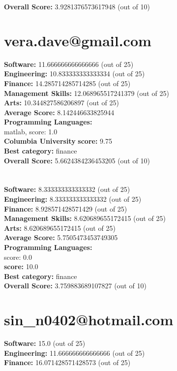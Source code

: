 \documentclass{article}
\begin{document}
\textbf{Overall Score: }3.9281376573617948 (out of 10)\section{vera.dave@gmail.com}
\textbf{Software:} 11.666666666666666 (out of 25)\\
\textbf{Engineering: } 10.833333333333334 (out of 25)\\
\textbf{Finance:} 14.285714285714285 (out of 25)\\
\textbf{Management Skills:} 12.068965517241379 (out of 25)\\
\textbf{Arts:} 10.344827586206897 (out of 25)\\
\textbf{Average Score: } 8.142446633825944\\
\textbf{Programming Languages:} \\
matlab, score: 1.0\\
\textbf{Columbia University} \textbf{score:} 9.75\\
\textbf{Best category: } finance\\
\textbf{Overall Score: }5.6624384236453205 (out of 10)\section{}
\textbf{Software:} 8.333333333333332 (out of 25)\\
\textbf{Engineering: } 8.333333333333332 (out of 25)\\
\textbf{Finance:} 8.928571428571429 (out of 25)\\
\textbf{Management Skills:} 8.620689655172415 (out of 25)\\
\textbf{Arts:} 8.620689655172415 (out of 25)\\
\textbf{Average Score: } 5.7505473453749305\\
\textbf{Programming Languages:} \\
score: 0.0\\
 \textbf{score:} 10.0\\
\textbf{Best category: } finance\\
\textbf{Overall Score: }3.759883689107827 (out of 10)\section{sin_n0402@hotmail.com}
\textbf{Software:} 15.0 (out of 25)\\
\textbf{Engineering: } 11.666666666666666 (out of 25)\\
\textbf{Finance:} 16.071428571428573 (out of 25)\\
\end{document}
